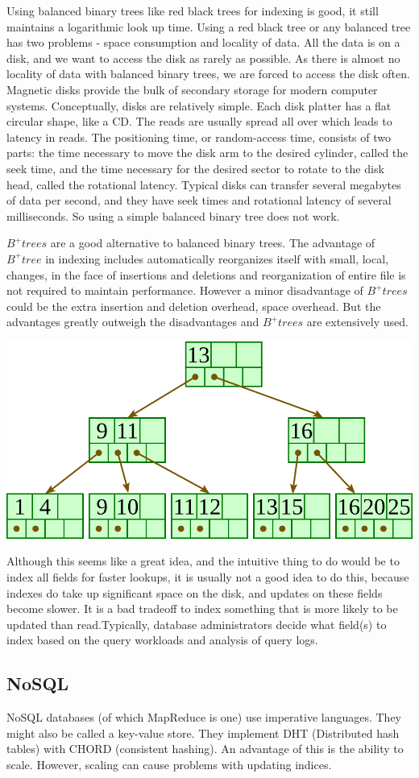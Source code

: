 \documentclass[twoside]{article}
\begin{document}
Using balanced binary trees like red black trees for indexing is good, it still maintains a logarithmic look up time. Using a red black tree or any balanced tree has two problems - space consumption and locality of data. All the data is on a disk, and we want to access the disk as rarely as possible. As there is almost no locality of data with balanced binary trees, we are forced to access the disk often. 
Magnetic disks provide the bulk of secondary storage for modern computer systems. Conceptually, disks are relatively simple. Each disk platter has a flat circular shape, like a CD. The reads are usually spread all over which leads to latency in reads. The positioning time, or random-access time, consists of two parts: the time necessary to move the disk arm to the desired cylinder, called the seek time, and the time necessary for the desired sector to rotate to the disk head, called the rotational latency. Typical disks can transfer several megabytes of data per second, and they have seek times and rotational latency of several milliseconds. So using a simple balanced binary tree does not work. 

$B^+ trees$ are a good alternative to balanced binary trees. The advantage of $B^+tree$ in  indexing includes automatically reorganizes itself with small, local, changes, in the face of insertions and deletions and reorganization of entire file is not required to maintain performance. However a minor disadvantage of $B^+ trees$ could be the extra insertion and deletion overhead, space overhead. But the advantages greatly outweigh the disadvantages and $B^+ trees$ are extensively used. 

 \includegraphics[scale = 0.60]{btree-6.png}
 
Although this seems like a great idea, and the intuitive thing to do would be to index all fields for faster lookups, it is usually not a good idea to do this, because indexes do take up significant space on the disk, and updates on these fields become slower. It is a bad tradeoff to index something that is more likely to be updated than read.Typically, database administrators decide what field(s) to index based on the query workloads and analysis of query logs.

\subsection{NoSQL}
NoSQL databases (of which MapReduce is one) use imperative languages. They might also be called a key-value store. They implement DHT (Distributed hash tables) with CHORD (consistent hashing). An advantage of this is the ability to scale. However, scaling can cause problems with updating indices.
\end{document}
